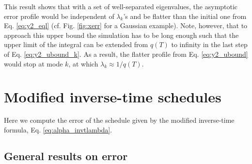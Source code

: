 \documentclass[reprint, superscriptaddress, floatfix]{revtex4-1}
\newcommand{\note}[1]{{\color{DarkGreen}\footnotesize \textsc{Note.} #1}}
\begin{document}
This result shows that with a set of well-separated eigenvalues,
the asymptotic error profile would be
independent of $\lambda_k$'s and
be flatter than the initial one from
Eq. \eqref{eq:y2_eql}
(cf. Fig. \ref{fig:xerr}
for a Gaussian example).
%
Note, however, that to approach this upper bound
the simulation has to be long enough
such that the upper limit of the integral
can be extended from $q(T)$ to infinity
in the last step of Eq. \eqref{eq:y2_ubound_k}.
%
As a result,
the flatter profile from Eq. \eqref{eq:y2_ubound}
would stop at mode $k$,
at which $\lambda_k \approx 1/q(T)$.




\section{\label{sec:invt_schedule}
Modified inverse-time schedules}



Here we compute the error of the schedule given by
the modified inverse-time formula,
Eq. \eqref{eq:alpha_invtlambda}.
%



\subsection{\label{sec:invt_error}
General results on error
}
\end{document}
